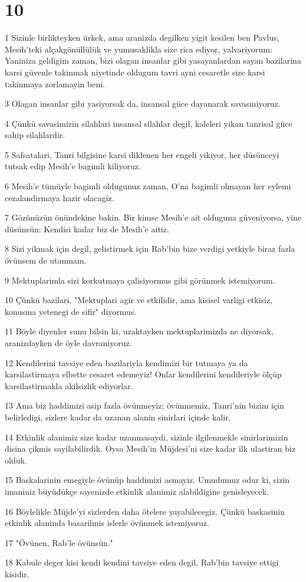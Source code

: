 \chapter{10}

\par 1 Sizinle birlikteyken ürkek, ama aranizda degilken yigit kesilen ben Pavlus, Mesih'teki alçakgönüllülük ve yumusaklikla size rica ediyor, yalvariyorum: Yaniniza geldigim zaman, bizi olagan insanlar gibi yasayanlardan sayan bazilarina karsi güvenle takinmak niyetinde oldugum tavri ayni cesaretle size karsi takinmaya zorlamayin beni.
\par 3 Olagan insanlar gibi yasiyorsak da, insansal güce dayanarak savasmiyoruz.
\par 4 Çünkü savasimizin silahlari insansal silahlar degil, kaleleri yikan tanrisal güce sahip silahlardir.
\par 5 Safsatalari, Tanri bilgisine karsi diklenen her engeli yikiyor, her düsünceyi tutsak edip Mesih'e bagimli kiliyoruz.
\par 6 Mesih'e tümüyle bagimli oldugunuz zaman, O'na bagimli olmayan her eylemi cezalandirmaya hazir olacagiz.
\par 7 Gözünüzün önündekine bakin. Bir kimse Mesih'e ait olduguna güveniyorsa, yine düsünsün: Kendisi kadar biz de Mesih'e aitiz.
\par 8 Sizi yikmak için degil, gelistirmek için Rab'bin bize verdigi yetkiyle biraz fazla övünsem de utanmam.
\par 9 Mektuplarimla sizi korkutmaya çalisiyormus gibi görünmek istemiyorum.
\par 10 Çünkü bazilari, "Mektuplari agir ve etkilidir, ama kisisel varligi etkisiz, konusma yetenegi de sifir" diyormus.
\par 11 Böyle diyenler sunu bilsin ki, uzaktayken mektuplarimizda ne diyorsak, aranizdayken de öyle davraniyoruz.
\par 12 Kendilerini tavsiye eden bazilariyla kendimizi bir tutmaya ya da karsilastirmaya elbette cesaret edemeyiz! Onlar kendilerini kendileriyle ölçüp karsilastirmakla akilsizlik ediyorlar.
\par 13 Ama biz haddimizi asip fazla övünmeyiz; övünmemiz, Tanri'nin bizim için belirledigi, sizlere kadar da uzanan alanin sinirlari içinde kalir.
\par 14 Etkinlik alanimiz size kadar uzanmasaydi, sizinle ilgilenmekle sinirlarimizin disina çikmis sayilabilirdik. Oysa Mesih'in Müjdesi'ni size kadar ilk ulastiran biz olduk.
\par 15 Baskalarinin emegiyle övünüp haddimizi asmayiz. Umudumuz odur ki, sizin imaniniz büyüdükçe sayenizde etkinlik alanimiz alabildigine genisleyecek.
\par 16 Böylelikle Müjde'yi sizlerden daha ötelere yayabilecegiz. Çünkü baskasinin etkinlik alaninda basarilmis islerle övünmek istemiyoruz.
\par 17 "Övünen, Rab'le övünsün."
\par 18 Kabule deger kisi kendi kendini tavsiye eden degil, Rab'bin tavsiye ettigi kisidir.

